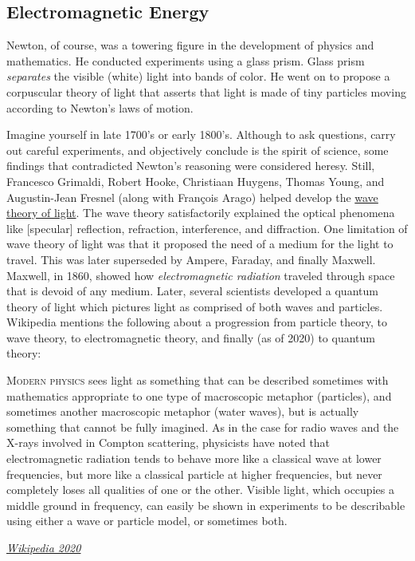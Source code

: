 \documentclass{article}
\begin{document}
{\subsection{Electromagnetic Energy}
Newton, of course, was a towering figure in the development of physics and mathematics. He conducted experiments using a glass prism. Glass prism \emph{separates} the visible (white) light into bands of color. He went on to propose a corpuscular theory of light that asserts that light is made of tiny particles moving according to Newton's laws of motion.

Imagine yourself in late 1700's or early 1800's. Although to ask questions, carry out careful experiments, and objectively conclude is the spirit of science, some findings that contradicted Newton's reasoning were considered heresy. Still, Francesco Grimaldi, Robert Hooke, Christiaan Huygens, Thomas Young, and Augustin-Jean Fresnel (along with François Arago) helped develop the \href{https://en.wikipedia.org/wiki/Light\#Wave_theory}{wave theory of light}. The wave theory satisfactorily explained the optical phenomena like [specular] reflection, refraction, interference, and diffraction. One limitation of wave theory of light was that it proposed the need of a medium for the light to travel. This was later superseded by Ampere, Faraday, and finally Maxwell. Maxwell, in 1860, showed how \emph{electromagnetic radiation} traveled through space that is devoid of any medium. Later, several scientists developed a quantum theory of light which pictures light as comprised of both waves and particles. Wikipedia mentions the following about a progression from particle theory, to wave theory, to electromagnetic theory, and finally (as of 2020) to quantum theory:

\setlength{\epigraphwidth}{0.9\textwidth}
\epigraph
{
    \lettrine[lines=3]{M}{odern physics} sees light as something that can be described sometimes with mathematics appropriate to one type of macroscopic metaphor (particles), and sometimes another macroscopic metaphor (water waves), but is actually something that cannot be fully imagined. As in the case for radio waves and the X-rays involved in Compton scattering, physicists have noted that electromagnetic radiation tends to behave more like a classical wave at lower frequencies, but more like a classical particle at higher frequencies, but never completely loses all qualities of one or the other. Visible light, which occupies a middle ground in frequency, can easily be shown in experiments to be describable using either a wave or particle model, or sometimes both.
}
{
    \textit{\href{https://en.wikipedia.org/wiki/Light\#Quantum_theory}{Wikipedia 2020}}
}

}
\end{document}
